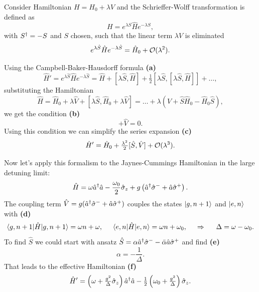 Consider Hamiltonian $H = H_0 + \lambda V$ and the Schrieffer-Wolff transformation is defined as
\begin{equation*}
	H = e^{\lambda S} \hat{H} e^{-\lambda S},
\end{equation*}
with $S^{\dag} = -S$ and $S$ chosen, such that the linear term $\lambda V$ is eliminated
\begin{equation*}
	e^{\lambda \hat{S}} \hat{H} e^{-\lambda \hat{S}} = \hat{H}_0 + \mathcal{O}(\lambda^2).
\end{equation*}

Using the Campbell-Baker-Hausdorff formula \textbf{(a)}
\begin{equation*}
	\hat{H}' = e^{\lambda \hat{S}} \hat{H} e^{-\lambda \hat{S}} = \hat{H} + [\lambda \hat{S}, \hat{H}] + \tfrac{1}{2} [\lambda \hat{S}, [\lambda \hat{S}, \hat{H}]] + \ldots,
\end{equation*}
substituting the Hamiltonian 
\begin{equation*}
	\hat{H} = \hat{H}_0 + \lambda \hat{V} + [\lambda \hat{S}, \hat{H}_0 + \lambda \hat{V}] = \ldots + \lambda\left(
		 \hat{V} + \hat{S} \hat{H}_0 - \hat{H}_0 \hat{S}
	\right),
\end{equation*}
we get the condition \textbf{(b)}
\begin{equation}
	[\hat{S}, \hat{H}_0] + \hat{V} = 0.
\end{equation}
Using this condition we can simplify the series expansion \textbf{(c)}
\begin{equation}
	\hat{H}' = \hat{H}_0 + \tfrac{\lambda^2}{2} [\hat{S}, \hat{V}] + \mathcal{O}(\lambda^3).
\end{equation}


Now let’s apply this formalism to the Jaynes-Cummings Hamiltonian in the large detuning limit:
\begin{equation*}
	\hat{H} = \omega \hat{a}^{\dag} \hat{a} - \frac{\omega_0}{2} \hat{\sigma}_z + g\left(\hat{a}^{\dag} \hat{\sigma}^- + \hat{a} \hat{\sigma}^+\right).
\end{equation*}
The coupling term $\hat{V} = g (\hat{a}^{\dag} \hat{\sigma}^- + \hat{a} \hat{\sigma}^+)$ couples the states $\left| g,n+1 \right\rangle$ and $\left| e,n \right\rangle$ with  \textbf{(d)}
\begin{equation*}
	\bk{g,n+1}[\hat{H}]{g,n+1} = \omega n + \omega,
	\hspace{5 mm} 
	\bk{e,n}[\hat{H}]{e,n} = \omega n + \omega_0,
	\hspace{0.5cm} \Rightarrow \hspace{0.5cm}
	\Delta = \omega - \omega_0.
\end{equation*}
To find $\hat{S}$ we could start with ansatz $\hat{S} = \alpha \hat{a}^{\dag} \hat{\sigma}^- - \bar{\alpha} \hat{a} \hat{\sigma}^+$ and find \textbf{(e)}
\begin{equation*}
	\alpha = -\frac{1}{\Delta}.
\end{equation*}
That leads to the effective Hamiltonian \textbf{(f)}
\begin{equation*}
	\hat{H}' = \left(\omega + \tfrac{g^2}{\Delta} \hat{\sigma}_z\right) \hat{a}^{\dag} \hat{a} - \tfrac{1}{2}\left(\omega_0 + \tfrac{g^2}{\Delta}\right)\hat{\sigma}_z.
\end{equation*}




